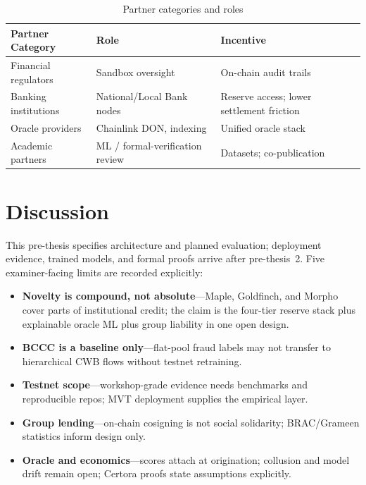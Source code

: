 \documentclass[12pt, a4paper]{report}
\newcommand{\tableheadcolor}{\rowcolor{TableHeadBg}}
\begin{document}
\vspace{2pt}

\begin{table}[H]
\centering
\caption[Partner categories and roles]{Partner categories and roles}
\label{tab:partner-categories-ch5}
\begin{tabular}{p{3.5cm}p{4.5cm}p{5.5cm}}
\toprule
\tableheadcolor
\textbf{Partner Category} & \textbf{Role} & \textbf{Incentive} \\
\midrule
Financial regulators & Sandbox oversight & On-chain audit trails \\
Banking institutions & National/Local Bank nodes & Reserve access; lower settlement friction \\
Oracle providers & Chainlink DON, indexing & Unified oracle stack \\
Academic partners & ML / formal-verification review & Datasets; co-publication \\
\bottomrule
\end{tabular}
\end{table}

\section{Discussion}
\label{sec:ch5-discussion}
\label{sec:research-limitations}
\label{sec:bangladesh-reg}

This pre-thesis specifies architecture and planned evaluation; deployment evidence, trained models, and formal proofs arrive after pre-thesis~2. Five examiner-facing limits are recorded explicitly:

\begin{itemize}[noitemsep]
\item \textbf{Novelty is compound, not absolute}---Maple, Goldfinch, and Morpho cover parts of institutional credit; the claim is the four-tier reserve stack plus explainable oracle ML plus group liability in one open design.
\item \textbf{BCCC is a baseline only}---flat-pool fraud labels may not transfer to hierarchical CWB flows without testnet retraining.
\item \textbf{Testnet scope}---workshop-grade evidence needs benchmarks and reproducible repos; MVT deployment supplies the empirical layer.
\item \textbf{Group lending}---on-chain cosigning is not social solidarity; BRAC/Grameen statistics inform design only.
\item \textbf{Oracle and economics}---scores attach at origination; collusion and model drift remain open; Certora proofs state assumptions explicitly.
\end{itemize}
\end{document}
